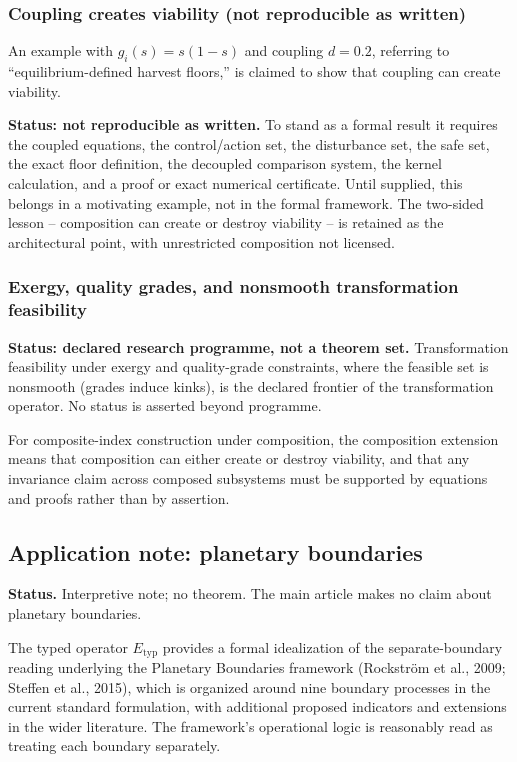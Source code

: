 \subsubsection{Coupling creates viability (not reproducible as written)}

An example with $g_i(s) = s(1-s)$ and coupling $d = 0.2$, referring to ``equilibrium-defined harvest floors,'' is claimed to show that coupling can create viability.

\textbf{Status: not reproducible as written.} To stand as a formal result it requires the coupled equations, the control/action set, the disturbance set, the safe set, the exact floor definition, the decoupled comparison system, the kernel calculation, and a proof or exact numerical certificate. Until supplied, this belongs in a motivating example, not in the formal framework. The two-sided lesson -- composition can create or destroy viability -- is retained as the architectural point, with unrestricted composition not licensed.

\subsubsection{Exergy, quality grades, and nonsmooth transformation feasibility}

\textbf{Status: declared research programme, not a theorem set.} Transformation feasibility under exergy and quality-grade constraints, where the feasible set is nonsmooth (grades induce kinks), is the declared frontier of the transformation operator. No status is asserted beyond programme.

For composite-index construction under composition, the composition extension means that composition can either create or destroy viability, and that any invariance claim across composed subsystems must be supported by equations and proofs rather than by assertion.

\subsection{Application note: planetary boundaries}

\noindent\textbf{Status.} Interpretive note; no theorem. The main article makes no claim about planetary boundaries.

The typed operator $E_{\mathrm{typ}}$ provides a formal idealization of the separate-boundary reading underlying the Planetary Boundaries framework (Rockstr\"om et al., 2009; Steffen et al., 2015), which is organized around nine boundary processes in the current standard formulation, with additional proposed indicators and extensions in the wider literature. The framework's operational logic is reasonably read as treating each boundary separately.

